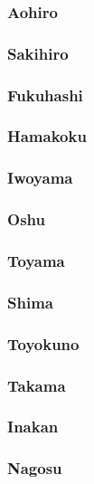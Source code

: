 		\subsubsection{Aohiro}
	
		\subsubsection{Sakihiro}
	
		\subsubsection{Fukuhashi}

		\subsubsection{Hamakoku}

		\subsubsection{Iwoyama}

		\subsubsection{Oshu}

		\subsubsection{Toyama}

		\subsubsection{Shima}

		\subsubsection{Toyokuno}

		\subsubsection{Takama}

		\subsubsection{Inakan}

		\subsubsection{Nagosu}

